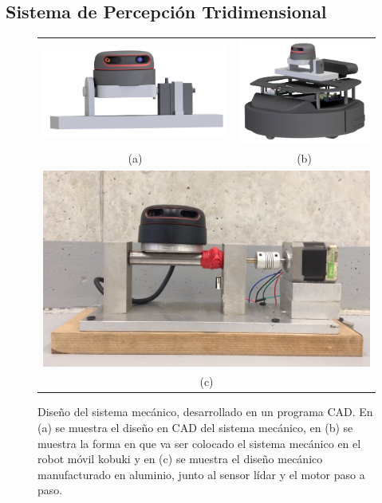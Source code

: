 \subsection{Sistema de Percepción Tridimensional}
\label{sec:SistP3D}
\begin{figure}%
  \centering
  \begin{tabular}{cc}
     \includegraphics[width=0.45\linewidth]{images/lidar_3d.png}&
     \includegraphics[width=0.45\linewidth]{images/lidar_wKbki.png}\\
    (a) & (b)\\
    \multicolumn{2}{c}{\includegraphics[width=0.70\linewidth]{images/LIDAR_SIST.JPG}}\\
    \multicolumn{2}{c}{(c)}
  \end{tabular}
  \captionsetup{font=footnotesize}
    \caption{\label{f:lidar3D}Diseño del sistema mecánico, desarrollado en un programa CAD. En (a) se 
    muestra el diseño en CAD del sistema mecánico, en (b) se muestra la forma en que va ser colocado 
    el sistema mecánico en el robot móvil kobuki y en (c) se muestra el diseño mecánico manufacturado 
    en aluminio, junto al sensor lídar y el motor paso a paso.}
\end{figure}
